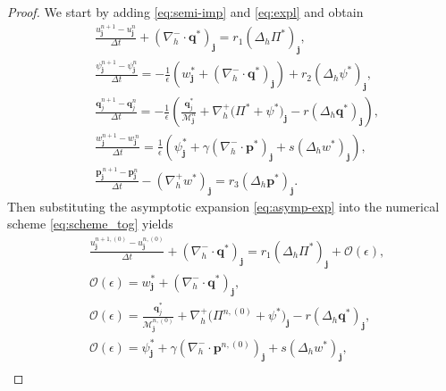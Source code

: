 \documentclass[11pt]{article}
\numberwithin{equation}{section}
\newtheorem{counter example}[theorem]{Counter Example}
\numberwithin{equation}{section}
\numberwithin{equation}{section}
\begin{document}
\begin{proof}
We start by adding \eqref{eq:semi-imp} and \eqref{eq:expl} and obtain
\begin{subequations}
\label{eq:scheme_tog}
\begin{align}
&\frac{u_{\mathbf{j}}^{n+1} - u_{\mathbf{j}}^{n}}{\Delta t} + (\nabla_h^- \cdot\mathbf{q}^*)_{\mathbf{j}} = r_1(\Delta_{h} \Pi^*)_{\mathbf{j}}, \\
&\frac{\psi_{\mathbf{j}}^{n+1} - \psi_{\mathbf{j}}^n}{\Delta t} 
= -\frac{1}{\epsilon}
\left(
w^*_{\mathbf{j}}+(\nabla_h^- \cdot \mathbf{q}^{*})_{\mathbf{j}}\right)+r_2(\Delta_h \psi^*)_{\mathbf{j}},\\
&\frac{\mathbf{q}_{j}^{n+1}-\mathbf{q}_{j}^{n}}{\Delta t} 
= -\frac{1}{\epsilon}
\left(
\frac{\mathbf{q}_{j}^{*}}{\mathcal{M}_{\mathbf{j}}^n}
+\nabla_h^+ \bigl(\Pi^*+\psi^{*}\bigr)_{\mathbf{j}}
-r(\Delta_{h} \mathbf{q}^{*})_{\mathbf{j}}
\right),\\
&\frac{w_{\mathbf{j}}^{n+1} - w_{\mathbf{j}}^{\,n}}{\Delta t} 
= \frac{1}{\epsilon}
\left(
\psi^*_{\mathbf{j}}
+\gamma(\nabla_h^- \cdot \mathbf{p}^{*})_{\mathbf{j}}
+s(\Delta_{h}w^{*})_{\mathbf{j}}
\right),\\
&\frac{\mathbf{p}_{\mathbf{j}}^{\,n+1} - \mathbf{p}_{\mathbf{j}}^{n}}{\Delta t} - (\nabla_h^+ w^{*})_{\mathbf{j}}= r_3(\Delta_h \mathbf{p}^*)_{\mathbf{j}}.
\end{align}
\end{subequations}
Then substituting the asymptotic expansion \eqref{eq:asymp-exp} into the numerical scheme \eqref{eq:scheme_tog} yields
\begin{subequations}
\label{eq:limit_scheme_tog}
\begin{align}
&\frac{u_{\mathbf{j}}^{n+1,(0)} - u_{\mathbf{j}}^{n,(0)}}{\Delta t} + (\nabla_h^- \cdot\mathbf{q}^*)_{\mathbf{j}} = r_1(\Delta_{h} \Pi^*)_{\mathbf{j}}+\mathcal{O}(\epsilon),\label{eq:h_updt_tog}\\
&\mathcal{O}(\epsilon) 
=
w^*_{\mathbf{j}}+(\nabla_h^- \cdot \mathbf{q}^{*})_{\mathbf{j}},\label{eq:psi_updt_tog}\\
&\mathcal{O}(\epsilon) 
= 
\frac{\mathbf{q}_{j}^{*}}{\mathcal{M}_{\mathbf{j}}^{n,(0)}}
+\nabla_h^+ \bigl(\Pi^{n,(0)}+\psi^{*}\bigr)_{\mathbf{j}}
-r(\Delta_{h} \mathbf{q}^{*})_{\mathbf{j}},\label{eq:q_updt_tog}\\
&\mathcal{O}(\epsilon)=
\psi^*_{\mathbf{j}}
+\gamma(\nabla_h^- \cdot \mathbf{p}^{n,(0)})_{\mathbf{j}}
+s(\Delta_{h}w^{*})_{\mathbf{j}},\label{eq:w_updt_tog}\\

\end{align}
\end{subequations}
\end{proof}
\end{document}
